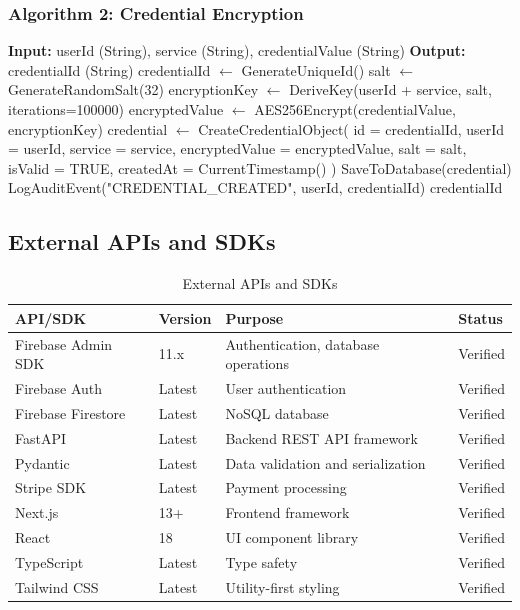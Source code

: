 \documentclass[12pt,a4paper]{article}
\begin{document}
\subsubsection{Algorithm 2: Credential Encryption}
\begin{algorithm}
\caption{StoreCredential(userId, service, credentialValue)}
\begin{algorithmic}[1]
\STATE \textbf{Input:} userId (String), service (String), credentialValue (String)
\STATE \textbf{Output:} credentialId (String)
\STATE
\STATE credentialId $\leftarrow$ GenerateUniqueId()
\STATE salt $\leftarrow$ GenerateRandomSalt(32)
\STATE encryptionKey $\leftarrow$ DeriveKey(userId + service, salt, iterations=100000)
\STATE encryptedValue $\leftarrow$ AES256Encrypt(credentialValue, encryptionKey)
\STATE credential $\leftarrow$ CreateCredentialObject(
\STATE \quad id = credentialId,
\STATE \quad userId = userId,
\STATE \quad service = service,
\STATE \quad encryptedValue = encryptedValue,
\STATE \quad salt = salt,
\STATE \quad isValid = TRUE,
\STATE \quad createdAt = CurrentTimestamp()
\STATE )
\STATE SaveToDatabase(credential)
\STATE LogAuditEvent("CREDENTIAL\_CREATED", userId, credentialId)
\RETURN credentialId
\end{algorithmic}
\end{algorithm}

\subsection{External APIs and SDKs}

\begin{table}[h]
\centering
\begin{tabularx}{\textwidth}{|l|l|X|l|}
\hline
\textbf{API/SDK} & \textbf{Version} & \textbf{Purpose} & \textbf{Status}\\
\hline
Firebase Admin SDK & 11.x & Authentication, database operations & Verified\\
\hline
Firebase Auth & Latest & User authentication & Verified\\
\hline
Firebase Firestore & Latest & NoSQL database & Verified\\
\hline
FastAPI & Latest & Backend REST API framework & Verified\\
\hline
Pydantic & Latest & Data validation and serialization & Verified\\
\hline
Stripe SDK & Latest & Payment processing & Verified\\
\hline
Next.js & 13+ & Frontend framework & Verified\\
\hline
React & 18 & UI component library & Verified\\
\hline
TypeScript & Latest & Type safety & Verified\\
\hline
Tailwind CSS & Latest & Utility-first styling & Verified\\
\hline
\end{tabularx}
\caption{External APIs and SDKs}
\end{table}
\end{document}
